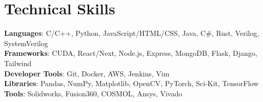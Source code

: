 \documentclass[letterpaper,11pt]{article}
\makeatletter
\newcommand{\resumeItem}[1]{
  \item\small{
    {#1 \vspace{-2pt}}
  }
}
\newcommand{\resumeProjectHeading}[2]{
    \item
    \begin{tabular*}{0.97\textwidth}{l@{\extracolsep{\fill}}r}
      \small#1 & #2 \\
    \end{tabular*}\vspace{-7pt}
}
\newcommand{\resumeSubHeadingListStart}{\begin{itemize}[leftmargin=0.15in, label={}]}
\newcommand{\resumeSubHeadingListEnd}{\end{itemize}}
\newcommand{\resumeItemListStart}{\begin{itemize}}
\newcommand{\resumeItemListEnd}{\end{itemize}\vspace{-5pt}}
\makeatother
\begin{document}

%
\section{Technical Skills}
 \begin{itemize}[leftmargin=0.15in, label={}]
    \small{\item{
     \textbf{Languages}{: C/C++, Python, JavaScript/HTML/CSS, Java, C\#, Rust, Verilog, SystemVerilog} \\
     \textbf{Frameworks}{: CUDA, React/Next, Node.js, Express, MongoDB, Flask, Django, Tailwind} \\
     \textbf{Developer Tools}{: Git, Docker, AWS, Jenkins, Vim} \\
     \textbf{Libraries}{: Pandas, NumPy, Matplotlib, OpenCV, PyTorch, Sci-Kit, TensorFlow} \\
     \textbf{Tools}{: Solidworks, Fusion360, COSMOL, Ansys, Vivado}
    }}
 \end{itemize}


\end{document}
